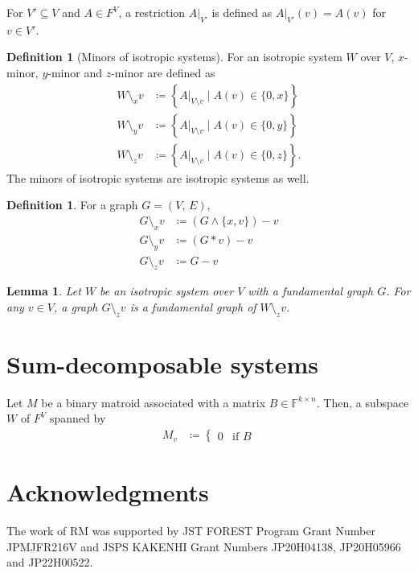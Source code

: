 \documentclass[twoside,10pt]{article}
\newtheorem{lemma}[theorem]{Lemma}
\theoremstyle{definition}
\newtheorem{definition}[theorem]{Definition}
\theoremstyle{remark}
\begin{document}
For $V'\subseteq V$ and $A\in F^V$, a restriction $A|_{V'}$ is defined as $A|_{V'}(v)=A(v)$ for $v\in V'$.
\begin{definition}[Minors of isotropic systems]
For an isotropic system $W$ over $V$, $x$-minor, $y$-minor and $z$-minor are defined as
\begin{align*}
W\setminus_x v&\coloneqq\left\{A|_{V\setminus v}\mid A(v)\in\{0,x\}\right\}\\
W\setminus_y v&\coloneqq\left\{A|_{V\setminus v}\mid A(v)\in\{0,y\}\right\}\\
W\setminus_z v&\coloneqq\left\{A|_{V\setminus v}\mid A(v)\in\{0,z\}\right\}.
\end{align*}
The minors of isotropic systems are isotropic systems as well.
\end{definition}

\begin{definition}
For a graph $G=(V,\,E)$,
\begin{align*}
G\setminus_x v &\coloneqq (G\wedge \{x,v\})-v\\
G\setminus_y v &\coloneqq (G*v) - v\\
G\setminus_z v &\coloneqq G - v
\end{align*}
\end{definition}

\begin{lemma}
Let $W$ be an isotropic system over $V$ with a fundamental graph $G$.
For any $v\in V$, a graph $G\setminus_z v$ is a fundamental graph of $W\setminus_z v$.
\end{lemma}

\section{Sum-decomposable systems}
Let $M$ be a binary matroid associated with a matrix $B\in\mathbb{F}^{k\times n}$.
Then, a subspace $W$ of $F^V$ spanned by
\begin{align*}
M_v&\coloneqq \begin{cases}
0&\text{if } B
\end{cases}
\end{align*}


\section*{Acknowledgments}
The work of RM was supported by JST FOREST Program Grant Number JPMJFR216V and JSPS KAKENHI Grant Numbers JP20H04138, JP20H05966 and JP22H00522.




\end{document}

